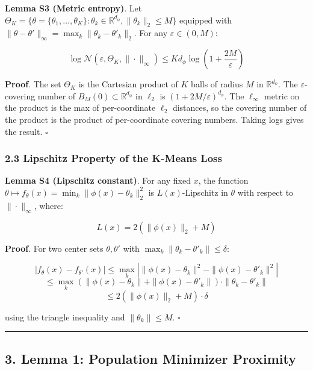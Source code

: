 \documentclass[
  12pt,
]{ctexart}
\begin{document}
\textbf{Lemma S3 (Metric entropy)}. Let
\(\Theta_K = \{\theta = \{\theta_1,\dots,\theta_K\} : \theta_k \in \mathbb{R}^{d_\phi}, \|\theta_k\|_2 \leq M\}\)
equipped with
\(\|\theta - \theta'\|_\infty = \max_k \|\theta_k - \theta'_k\|_2\). For
any \(\varepsilon \in (0, M)\):

\[\log \mathcal{N}(\varepsilon, \Theta_K, \|\cdot\|_\infty) \leq K d_\phi \log\left(1 + \frac{2M}{\varepsilon}\right)\]

\textbf{Proof}. The set \(\Theta_K\) is the Cartesian product of \(K\)
balls of radius \(M\) in \(\mathbb{R}^{d_\phi}\). The
\(\varepsilon\)-covering number of
\(B_M(0) \subset \mathbb{R}^{d_\phi}\) in \(\ell_2\) is
\((1+2M/\varepsilon)^{d_\phi}\). The \(\ell_\infty\) metric on the
product is the max of per-coordinate \(\ell_2\) distances, so the
covering number of the product is the product of per-coordinate covering
numbers. Taking logs gives the result. \(\square\)

\subsubsection{2.3 Lipschitz Property of the K-Means
Loss}\label{lipschitz-property-of-the-k-means-loss}

\textbf{Lemma S4 (Lipschitz constant)}. For any fixed \(x\), the
function
\(\theta \mapsto f_\theta(x) = \min_k \|\phi(x) - \theta_k\|_2^2\) is
\(L(x)\)-Lipschitz in \(\theta\) with respect to \(\|\cdot\|_\infty\),
where:

\[L(x) = 2(\|\phi(x)\|_2 + M)\]

\textbf{Proof}. For two center sets \(\theta, \theta'\) with
\(\max_k \|\theta_k - \theta'_k\| \leq \delta\):

\[|f_\theta(x) - f_{\theta'}(x)| \leq \max_k \left| \|\phi(x) - \theta_k\|^2 - \|\phi(x) - \theta'_k\|^2 \right|\]
\[\leq \max_k \left( \|\phi(x) - \theta_k\| + \|\phi(x) - \theta'_k\| \right) \cdot \|\theta_k - \theta'_k\|\]
\[\leq 2\left(\|\phi(x)\|_2 + M\right) \cdot \delta\]

using the triangle inequality and \(\|\theta_k\| \leq M\). \(\square\)

\begin{center}\rule{0.5\linewidth}{0.5pt}\end{center}

\subsection{3. Lemma 1: Population Minimizer
Proximity}\label{lemma-1-population-minimizer-proximity}
\end{document}
